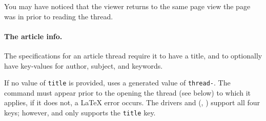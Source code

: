 \documentclass{article}
\begin{document}
You may have noticed that the viewer returns to the same page view the page
was in prior to reading the thread.

\paragraph*{The article info.} The specifications for an article thread require
it to have a title, and to optionally have key-values for author, subject, and keywords.
\bVerb{}%
\begin{dCmd}[commandchars=!()]{\bxSize}
\end{dCmd}
\endgroup\noindent If no value of \texttt{title} is provided,  uses
a generated value of \texttt{thread-}. The 
command must appear prior to the opening the thread (see  below)
to which it applies, if it does not, a {\LaTeX} error occurs. The drivers
 and  (, ) support all four
keys; however,  and  only supports the
\texttt{title} key.
\end{document}
